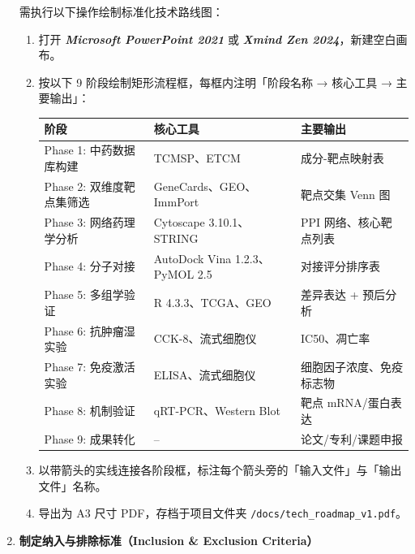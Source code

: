 \documentclass[12pt,a4paper,twoside]{article}
\newcommand{\software}[1]{\textbf{\textit{#1}}}
\begin{document}
\begin{enumerate}
    需执行以下操作绘制标准化技术路线图：
    \begin{enumerate}
      \item 打开 \software{Microsoft PowerPoint 2021} 或 \software{Xmind Zen 2024}，新建空白画布。
      \item 按以下 9 阶段绘制矩形流程框，每框内注明「阶段名称 → 核心工具 → 主要输出」：
        \begin{center}
        \small
        \begin{tabular}{lll}
        \toprule
        \textbf{阶段} & \textbf{核心工具} & \textbf{主要输出} \\
        \midrule
        Phase 1: 中药数据库构建 & TCMSP、ETCM & 成分-靶点映射表 \\
        Phase 2: 双维度靶点集筛选 & GeneCards、GEO、ImmPort & 靶点交集 Venn 图 \\
        Phase 3: 网络药理学分析 & Cytoscape 3.10.1、STRING & PPI 网络、核心靶点列表 \\
        Phase 4: 分子对接 & AutoDock Vina 1.2.3、PyMOL 2.5 & 对接评分排序表 \\
        Phase 5: 多组学验证 & R 4.3.3、TCGA、GEO & 差异表达 + 预后分析 \\
        Phase 6: 抗肿瘤湿实验 & CCK-8、流式细胞仪 & IC50、凋亡率 \\
        Phase 7: 免疫激活实验 & ELISA、流式细胞仪 & 细胞因子浓度、免疫标志物 \\
        Phase 8: 机制验证 & qRT-PCR、Western Blot & 靶点 mRNA/蛋白表达 \\
        Phase 9: 成果转化 & -- & 论文/专利/课题申报 \\
        \bottomrule
        \end{tabular}
        \end{center}
      \item 以带箭头的实线连接各阶段框，标注每个箭头旁的「输入文件」与「输出文件」名称。
      \item 导出为 A3 尺寸 PDF，存档于项目文件夹 \texttt{/docs/tech\_roadmap\_v1.pdf}。
    \end{enumerate}

  \item \textbf{制定纳入与排除标准（Inclusion \& Exclusion Criteria）}


\end{enumerate}
\end{document}
